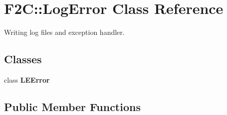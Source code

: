 \hypertarget{class_f2_c_1_1_log_error}{
\section{F2C::LogError Class Reference}
\label{class_f2_c_1_1_log_error}
}


Writing log files and exception handler.  


\subsection*{Classes}
\begin{DoxyCompactItemize}
\item 
class {\bfseries LEError}
\end{DoxyCompactItemize}
\subsection*{Public Member Functions}
